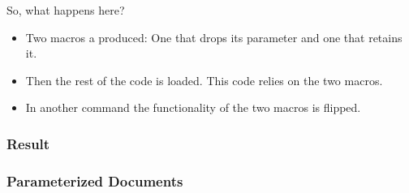 {\begin{frame}[fragile]
  \pause
  \vspace{5mm}
  So, what happens here?
  \pause
  \begin{itemize}
    \item Two macros a produced: One that drops its parameter and one that retains it.
    \item Then the rest of the code is loaded. This code relies on the two macros.
    \item In another command the functionality of the two macros is flipped.
  \end{itemize}
\end{frame}

\subsubsection{Result}
\begin{frame}[fragile]
  \frametitle{Parameterized Documents }
  \pause
\end{frame}

}
